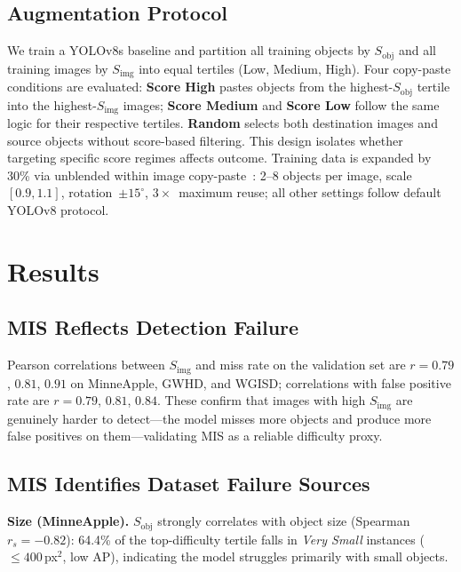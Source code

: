 \documentclass[conference,a4paper]{IEEEtran}
\begin{document}
\subsection{Augmentation Protocol}
We train a YOLOv8s baseline and partition all training objects by
$S_{\mathrm{obj}}$ and all training images by $S_{\mathrm{img}}$ into
equal tertiles (Low, Medium, High).
Four copy-paste conditions are evaluated:
\textbf{Score High} pastes objects from the highest-$S_{\mathrm{obj}}$
tertile into the highest-$S_{\mathrm{img}}$ images;
\textbf{Score Medium} and \textbf{Score Low} follow the same logic
for their respective tertiles.
\textbf{Random} selects both destination images and source objects
without score-based filtering.
This design isolates whether targeting specific score regimes
affects outcome. Training data is expanded by 30\% via unblended within image
copy-paste~\cite{kisantal2019augmentation}: 2--8 objects per image,
scale~$[0.9,1.1]$, rotation~$\pm15^\circ$, $3{\times}$~maximum
reuse; all other settings follow default YOLOv8 protocol.

\section{Results}
\subsection{MIS Reflects Detection Failure}

Pearson correlations between $S_{\mathrm{img}}$ and miss rate
on the validation set are $r{=}0.79$, $0.81$, $0.91$ on
MinneApple, GWHD, and WGISD; correlations with false positive
rate are $r{=}0.79$, $0.81$, $0.84$. These confirm that images
with high $S_{\mathrm{img}}$ are genuinely harder to
detect---the model misses more objects and produce more false positives on 
them---validating
MIS as a reliable difficulty proxy.

\subsection{MIS Identifies Dataset Failure Sources}

\textbf{Size (MinneApple).}
$S_{\mathrm{obj}}$ strongly correlates with object size
(Spearman~$r_s{=}{-}0.82$): 64.4\% of the top-difficulty
tertile falls in \textit{Very Small} instances
(${\le}400$\,px$^2$, low AP), indicating the model struggles
primarily with small objects.
\end{document}
